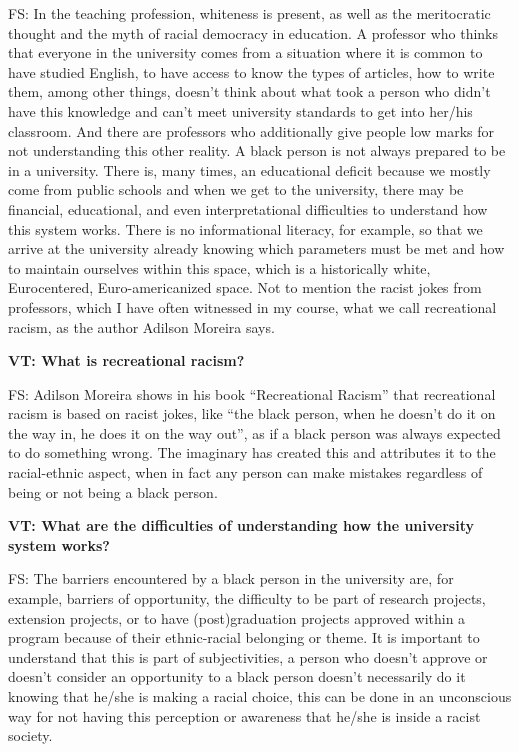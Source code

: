 \documentclass[a4paper,
fontsize=11pt,
oneside,
numbers=noperiodatend,
parskip=half-,
bibliography=totoc,
final
]{scrartcl}
\begin{document}
FS: In the teaching profession, whiteness is present, as well as the
meritocratic thought and the myth of racial democracy in education. A
professor who thinks that everyone in the university comes from a
situation where it is common to have studied English, to have access to
know the types of articles, how to write them, among other things,
doesn't think about what took a person who didn't have this knowledge
and can't meet university standards to get into her/his classroom. And
there are professors who additionally give people low marks for not
understanding this other reality. A black person is not always prepared
to be in a university. There is, many times, an educational deficit
because we mostly come from public schools and when we get to the
university, there may be financial, educational, and even
interpretational difficulties to understand how this system works. There
is no informational literacy, for example, so that we arrive at the
university already knowing which parameters must be met and how to
maintain ourselves within this space, which is a historically white,
Eurocentered, Euro-americanized space. Not to mention the racist jokes
from professors, which I have often witnessed in my course, what we call
recreational racism, as the author Adilson Moreira says.


\textbf{VT: What is recreational racism?}

FS: Adilson Moreira shows in his book \enquote{Recreational Racism} that
recreational racism is based on racist jokes, like \enquote{the black
person, when he doesn't do it on the way in, he does it on the way out},
as if a black person was always expected to do something wrong. The
imaginary has created this and attributes it to the racial-ethnic
aspect, when in fact any person can make mistakes regardless of being or
not being a black person.

\textbf{VT: What are the difficulties of understanding how the
university system works?}

FS: The barriers encountered by a black person in the university are,
for example, barriers of opportunity, the difficulty to be part of
research projects, extension projects, or to have (post)graduation
projects approved within a program because of their ethnic-racial
belonging or theme. It is important to understand that this is part of
subjectivities, a person who doesn't approve or doesn't consider an
opportunity to a black person doesn't necessarily do it knowing that
he/she is making a racial choice, this can be done in an unconscious way
for not having this perception or awareness that he/she is inside a
racist society.
\end{document}
